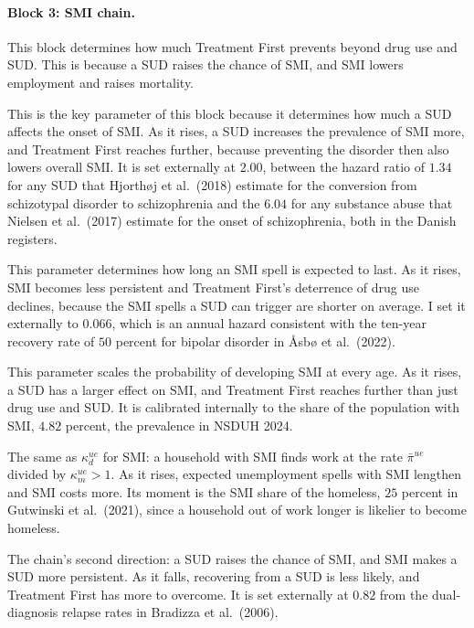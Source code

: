 \documentclass[10pt]{article}
\begin{document}
\paragraph{Block 3: SMI chain.}   This block determines how much  Treatment First prevents beyond drug use and SUD. This is because a SUD raises the chance of SMI, and SMI lowers employment and raises mortality.
\begin{description}\setlength{\itemsep}{0.25em}\setlength{\parskip}{0em}
\item[$\iota$, the SUD multiplier on SMI onset.]   This is the key parameter of this block because it determines how much a SUD affects the onset of SMI. As it rises, a SUD increases the prevalence of SMI more, and Treatment First reaches further, because preventing the disorder then also lowers overall SMI. It is set externally at $2.00$, between the hazard ratio of $1.34$ for any SUD that Hjorth\o j et al.\ (2018) estimate for the conversion from schizotypal disorder to schizophrenia and the $6.04$ for any substance abuse that Nielsen et al.\ (2017) estimate for the onset of schizophrenia, both in the Danish registers.
\item[$\lambda_m$, the annual chance of recovering from SMI.]   This parameter determines how long an SMI spell is expected to last. As it rises, SMI becomes less persistent and Treatment First's deterrence of drug use declines, because the SMI spells a SUD can trigger are shorter on average. I set it externally to $0.066$, which is an annual hazard consistent with the ten-year recovery rate of $50$ percent for bipolar disorder in {\AA}sb{\o} et al.\ (2022).
\item[$\omega_m$, the level of the SMI onset profile.]   This parameter scales the probability of developing SMI at every age. As it rises, a SUD has a larger effect on SMI, and Treatment First reaches further than just drug use and SUD. It is calibrated internally to the share of the population with SMI, $4.82$ percent, the prevalence in NSDUH 2024.
\item[$\kappa^{ue}_{m}$, how much less likely it is to regain employment with SMI.] The same as $\kappa^{ue}_{d}$ for SMI: a household with SMI finds work at the rate $\bar\pi^{ue}$ divided by $\kappa^{ue}_{m}{}>1$. As it rises, expected unemployment spells with SMI lengthen and SMI costs more. Its moment is the SMI share of the homeless, $25$ percent in Gutwinski et al.\ (2021), since a household out of work longer is likelier to become homeless.
\item[$\mu_m$, the SUD recovery multiplier for SMI.] The chain's second direction: a SUD raises the chance of SMI, and SMI makes a SUD more persistent. As it falls, recovering from a SUD is less likely, and Treatment First has more to overcome. It is set externally at $0.82$ from the dual-diagnosis relapse rates in Bradizza et al.\ (2006).

\end{description}
\end{document}
